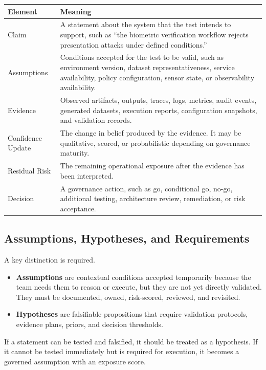 \documentclass[11pt,a4paper]{article}
\begin{document}
\begin{longtable}{p{3.3cm}p{10.2cm}}
\toprule
\textbf{Element} & \textbf{Meaning} \\
\midrule
Claim & A statement about the system that the test intends to support, such as ``the biometric verification workflow rejects presentation attacks under defined conditions.'' \\
Assumptions & Conditions accepted for the test to be valid, such as environment version, dataset representativeness, service availability, policy configuration, sensor state, or observability availability. \\
Evidence & Observed artifacts, outputs, traces, logs, metrics, audit events, generated datasets, execution reports, configuration snapshots, and validation records. \\
Confidence Update & The change in belief produced by the evidence. It may be qualitative, scored, or probabilistic depending on governance maturity. \\
Residual Risk & The remaining operational exposure after the evidence has been interpreted. \\
Decision & A governance action, such as go, conditional go, no-go, additional testing, architecture review, remediation, or risk acceptance. \\
\bottomrule
\end{longtable}


\subsection{Assumptions, Hypotheses, and Requirements}

A key distinction is required.

\begin{itemize}
\item \textbf{Assumptions} are contextual conditions accepted temporarily because the team needs them to reason or execute, but they are not yet directly validated. They must be documented, owned, risk-scored, reviewed, and revisited.
\item \textbf{Hypotheses} are falsifiable propositions that require validation protocols, evidence plans, priors, and decision thresholds.
\end{itemize}

If a statement can be tested and falsified, it should be treated as a hypothesis. If it cannot be tested immediately but is required for execution, it becomes a governed assumption with an exposure score.
\end{document}
